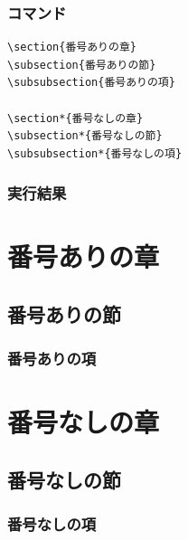 \documentclass[a4j, titlepage]{jarticle}
\begin{document}
\begin{multicols}{2}

\subsubsection*{コマンド}

\begin{lstlisting}
\section{番号ありの章}
\subsection{番号ありの節}
\subsubsection{番号ありの項}

\section*{番号なしの章}
\subsection*{番号なしの節}
\subsubsection*{番号なしの項}

\end{lstlisting}

\vfill\null
\columnbreak

\subsubsection*{実行結果}
\setcounter{section}{0}
\begin{screen}

    \section{番号ありの章}
    \subsection{番号ありの節}
    \subsubsection{番号ありの項}

    \section*{番号なしの章}
    \subsection*{番号なしの節}
    \subsubsection*{番号なしの項}

\end{screen}
\end{multicols}
\end{document}
